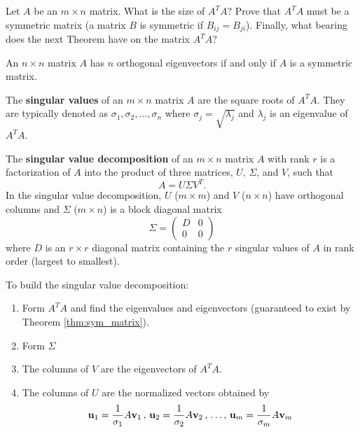 \begin{problem}
    Let $A$ be an $m \times n$ matrix.  What is the size of $A^T A$?  Prove that $A^T A$
    must be a symmetric matrix (a matrix $B$ is symmetric if $B_{ij} = B_{ji}$).  Finally, what bearing
    does the next Theorem have on the matrix $A^T A$?
\end{problem}




\begin{thm}\label{thm:sym_matrix}
    An $n \times n$ matrix $A$ has $n$ orthogonal eigenvectors if and only if $A$ is a
    symmetric matrix.
\end{thm}


\begin{definition}
The {\bf singular values} of an $m \times n$ matrix $A$ are the square roots of $A^T A$.
They are typically denoted as $\sigma_1, \sigma_2, \dots, \sigma_n$ where $\sigma_j =
\sqrt{\lambda_j}$ and $\lambda_j$ is an eigenvalue of $A^T A$.  
\end{definition}

\begin{definition}
    The {\bf singular value decomposition} of an $m \times n$ matrix $A$ with rank $r$ is
    a factorization of $A$ into the product of three matrices, $U$, $\Sigma$, and $V$,
    such that
    \[ A = U \Sigma V^T. \]
    In the singular value decomposition, $U$ ($m \times m$) and $V$ ($n \times n$) have
    orthogonal columns and $\Sigma$ ($m \times n$)
    is a block diagonal matrix 
    \[ \Sigma = \begin{pmatrix} D & 0 \\ 0 & 0 \end{pmatrix} \]
    where $D$ is an $r \times r$ diagonal matrix containing the $r$ singular values of
    $A$ in rank order (largest to smallest).

    To build the singular value decomposition:
    \begin{enumerate}
        \item Form $A^TA$ and find the eigenvalues and eigenvectors (guaranteed to exist
            by Theorem \ref{thm:sym_matrix}).
        \item Form $\Sigma$
        \item The columns of $V$ are the eigenvectors of $A^T A$.
        \item The columns of $U$ are the normalized vectors obtained by 
            \[ {\bf u}_1 = \frac{1}{\sigma_1} A {\bf v}_1\, , \, {\bf u}_2 = \frac{1}{\sigma_2} A
            {\bf v}_2 \, , \, \dots, \, {\bf u}_m = \frac{1}{\sigma_m} A {\bf v}_m \]
    \end{enumerate}
\end{definition}

